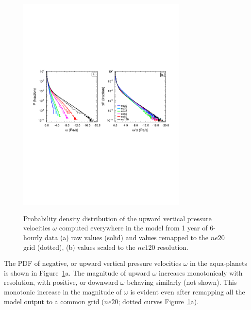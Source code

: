 \begin{figure}[t]
\begin{center}
\noindent\includegraphics[width=20pc,angle=0]{figs/temp_2pdf.pdf}\\
\end{center}
\caption{Probability density distribution of the upward vertical pressure velocities $\omega$ computed everywhere in the model from 1 year of 6-hourly data (a) raw values (solid) and values remapped to the $ne20$ grid (dotted), (b) values scaled to the $ne120$ resolution.}
\label{fig:2pdf}
\end{figure}

The PDF of negative, or upward vertical pressure velocities $\omega$ in the aqua-planets is shown in Figure~\ref{fig:2pdf}a. The magnitude of upward $\omega$ increases monotonicaly with resolution, with positive, or downward $\omega$ behaving similarly (not shown). This monotonic increase in the magnitude of $\omega$ is evident even after remapping all the model output to a common grid ($ne20$; dotted curves Figure~\ref{fig:2pdf}a).


